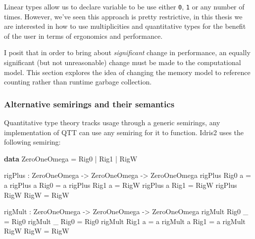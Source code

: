 \documentclass[
]{article}
\newenvironment{Shaded}{}{}
\newcommand{\DataTypeTok}[1]{\textcolor[rgb]{0.56,0.13,0.00}{#1}}
\newcommand{\KeywordTok}[1]{\textcolor[rgb]{0.00,0.44,0.13}{\textbf{#1}}}
\newcommand{\NormalTok}[1]{#1}
\newcommand{\OperatorTok}[1]{\textcolor[rgb]{0.40,0.40,0.40}{#1}}
\newcommand{\OtherTok}[1]{\textcolor[rgb]{0.00,0.44,0.13}{#1}}
\begin{document}
Linear types allow us to declare variable to be use either \texttt{0},
\texttt{1} or any number of times. However, we've seen this approach is
pretty restrictive, in this thesis we are interested in how to use
multiplicities and quantitative types for the benefit of the user in
terms of ergonomics and performance.

I posit that in order to bring about \emph{significant} change in
performance, an equally significant (but not unreasonable) change must
be made to the computational model. This section explores the idea of
changing the memory model to reference counting rather than runtime
garbage collection.

\hypertarget{alternative-semirings-and-their-semantics}{%
\subsubsection{Alternative semirings and their
semantics}\label{alternative-semirings-and-their-semantics}}

Quantitative type theory tracks usage through a generic semirings, any
implementation of QTT can use any semiring for it to function. Idris2
uses the following semiring:

\begin{Shaded}
\begin{Highlighting}[]
\KeywordTok{data} \DataTypeTok{ZeroOneOmega} \OtherTok{=} \DataTypeTok{Rig0} \OperatorTok{|} \DataTypeTok{Rig1} \OperatorTok{|} \DataTypeTok{RigW}

\NormalTok{rigPlus }\OperatorTok{:} \DataTypeTok{ZeroOneOmega} \OtherTok{{-}\textgreater{}} \DataTypeTok{ZeroOneOmega} \OtherTok{{-}\textgreater{}} \DataTypeTok{ZeroOneOmega}
\NormalTok{rigPlus }\DataTypeTok{Rig0}\NormalTok{ a }\OtherTok{=}\NormalTok{ a}
\NormalTok{rigPlus a }\DataTypeTok{Rig0} \OtherTok{=}\NormalTok{ a}
\NormalTok{rigPlus }\DataTypeTok{Rig1}\NormalTok{ a }\OtherTok{=} \DataTypeTok{RigW}
\NormalTok{rigPlus a }\DataTypeTok{Rig1} \OtherTok{=} \DataTypeTok{RigW}
\NormalTok{rigPlus }\DataTypeTok{RigW} \DataTypeTok{RigW} \OtherTok{=} \DataTypeTok{RigW}

\NormalTok{rigMult }\OperatorTok{:} \DataTypeTok{ZeroOneOmega} \OtherTok{{-}\textgreater{}} \DataTypeTok{ZeroOneOmega} \OtherTok{{-}\textgreater{}} \DataTypeTok{ZeroOneOmega}
\NormalTok{rigMult }\DataTypeTok{Rig0}\NormalTok{ \_ }\OtherTok{=} \DataTypeTok{Rig0}
\NormalTok{rigMult \_ }\DataTypeTok{Rig0} \OtherTok{=} \DataTypeTok{Rig0}
\NormalTok{rigMult }\DataTypeTok{Rig1}\NormalTok{ a }\OtherTok{=}\NormalTok{ a}
\NormalTok{rigMult a }\DataTypeTok{Rig1} \OtherTok{=}\NormalTok{ a}
\NormalTok{rigMult }\DataTypeTok{RigW} \DataTypeTok{RigW} \OtherTok{=} \DataTypeTok{RigW}
\end{Highlighting}
\end{Shaded}
\end{document}
